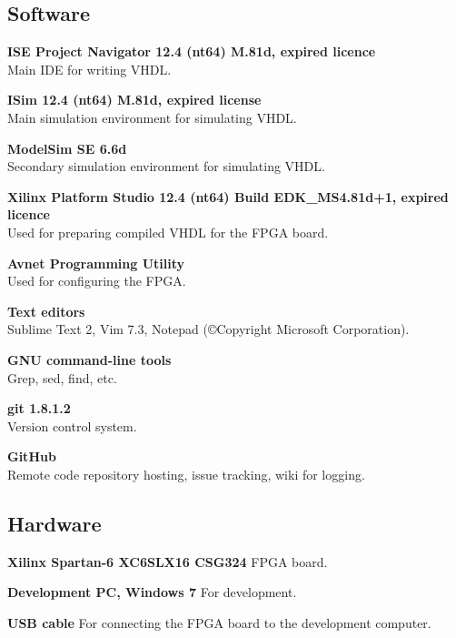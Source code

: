 \subsection{Software}
\begin{description}
    \item{\textbf{ISE Project Navigator 12.4 (nt64) M.81d, expired licence}} \\
        Main IDE for writing VHDL.
    \item{\textbf{ISim 12.4 (nt64) M.81d, expired license}} \\
        Main simulation environment for simulating VHDL.
    \item{\textbf{ModelSim SE 6.6d}} \\
        Secondary simulation environment for simulating VHDL.
    \item{\textbf{Xilinx Platform Studio 12.4 (nt64) Build EDK\_MS4.81d+1, expired licence}} \\
        Used for preparing compiled VHDL for the FPGA board.
    \item{\textbf{Avnet Programming Utility}} \\
        Used for configuring the FPGA.
    \item{\textbf{Text editors}} \\
        Sublime Text 2, Vim 7.3, Notepad (©Copyright Microsoft Corporation).
    \item{\textbf{GNU command-line tools}} \\
        Grep, sed, find, etc.
    \item{\textbf{git 1.8.1.2}} \\
        Version control system.
    \item{\textbf{GitHub}} \\
        Remote code repository hosting, issue tracking, wiki for logging.
\end{description}

\subsection{Hardware}
\begin{description}
\item{\textbf{Xilinx Spartan-6 XC6SLX16 CSG324}}
    FPGA board.
\item{\textbf{Development PC, Windows 7}}
    For development.
\item{\textbf{USB cable}}
    For connecting the FPGA board to the development computer.
\end{description}

